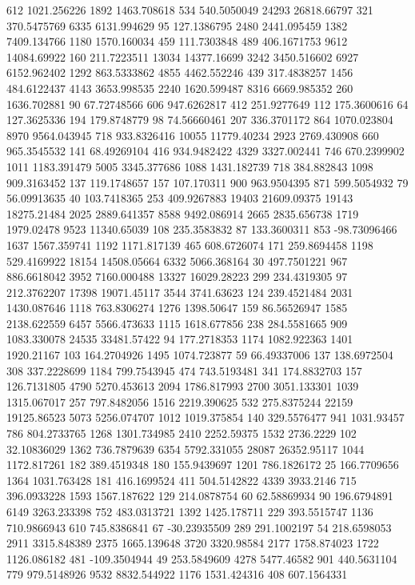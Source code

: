 612	1021.256226
1892	1463.708618
534	540.5050049
24293	26818.66797
321	370.5475769
6335	6131.994629
95	127.1386795
2480	2441.095459
1382	7409.134766
1180	1570.160034
459	111.7303848
489	406.1671753
9612	14084.69922
160	211.7223511
13034	14377.16699
3242	3450.516602
6927	6152.962402
1292	863.5333862
4855	4462.552246
439	317.4838257
1456	484.6122437
4143	3653.998535
2240	1620.599487
8316	6669.985352
260	1636.702881
90	67.72748566
606	947.6262817
412	251.9277649
112	175.3600616
64	127.3625336
194	179.8748779
98	74.56660461
207	336.3701172
864	1070.023804
8970	9564.043945
718	933.8326416
10055	11779.40234
2923	2769.430908
660	965.3545532
141	68.49269104
416	934.9482422
4329	3327.002441
746	670.2399902
1011	1183.391479
5005	3345.377686
1088	1431.182739
718	384.882843
1098	909.3163452
137	119.1748657
157	107.170311
900	963.9504395
871	599.5054932
79	56.09913635
40	103.7418365
253	409.9267883
19403	21609.09375
19143	18275.21484
2025	2889.641357
8588	9492.086914
2665	2835.656738
1719	1979.02478
9523	11340.65039
108	235.3583832
87	133.3600311
853	-98.73096466
1637	1567.359741
1192	1171.817139
465	608.6726074
171	259.8694458
1198	529.4169922
18154	14508.05664
6332	5066.368164
30	497.7501221
967	886.6618042
3952	7160.000488
13327	16029.28223
299	234.4319305
97	212.3762207
17398	19071.45117
3544	3741.63623
124	239.4521484
2031	1430.087646
1118	763.8306274
1276	1398.50647
159	86.56526947
1585	2138.622559
6457	5566.473633
1115	1618.677856
238	284.5581665
909	1083.330078
24535	33481.57422
94	177.2718353
1174	1082.922363
1401	1920.21167
103	164.2704926
1495	1074.723877
59	66.49337006
137	138.6972504
308	337.2228699
1184	799.7543945
474	743.5193481
341	174.8832703
157	126.7131805
4790	5270.453613
2094	1786.817993
2700	3051.133301
1039	1315.067017
257	797.8482056
1516	2219.390625
532	275.8375244
22159	19125.86523
5073	5256.074707
1012	1019.375854
140	329.5576477
941	1031.93457
786	804.2733765
1268	1301.734985
2410	2252.59375
1532	2736.2229
102	32.10836029
1362	736.7879639
6354	5792.331055
28087	26352.95117
1044	1172.817261
182	389.4519348
180	155.9439697
1201	786.1826172
25	166.7709656
1364	1031.763428
181	416.1699524
411	504.5142822
4339	3933.2146
715	396.0933228
1593	1567.187622
129	214.0878754
60	62.58869934
90	196.6794891
6149	3263.233398
752	483.0313721
1392	1425.178711
229	393.5515747
1136	710.9866943
610	745.8386841
67	-30.23935509
289	291.1002197
54	218.6598053
2911	3315.848389
2375	1665.139648
3720	3320.98584
2177	1758.874023
1722	1126.086182
481	-109.3504944
49	253.5849609
4278	5477.46582
901	440.5631104
779	979.5148926
9532	8832.544922
1176	1531.424316
408	607.1564331
